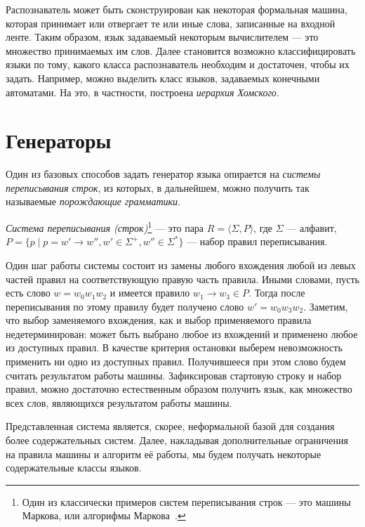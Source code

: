 Распознаватель может быть сконструирован как некоторая формальная машина, которая принимает или отвергает те или иные слова, записанные на входной ленте.
Таким образом, язык задаваемый некоторым вычислителем --- это множество принимаемых им слов.
Далее становится возможно классифицировать языки по тому, какого класса распознаватель необходим и достаточен, чтобы их задать.
Например, можно выделить класс языков, задаваемых конечными автоматами.
На это, в частности, построена \textit{иерархия Хомского}.





\section{Генераторы}

Один из базовых способов задать генератор языка опирается на \textit{системы переписывания строк}, из которых, в дальнейшем, можно получить так называемые \textit{порождающие грамматики}.

\begin{definition}
  \textit{Система переписывания (строк)}\footnote{Один из классически примеров систем переписывания строк --- это машины Маркова, или алгорифмы Маркова~\cite{markov1954theory}.} --- это пара $R = \langle \Sigma, P  \rangle$, где $\Sigma$ --- алфавит, $P= \{p \mid p = w' \to w'', w' \in \Sigma^+, w'' \in \Sigma^*\}$ --- набор правил переписывания.
\end{definition}

Один шаг работы системы состоит из замены любого вхождения любой из левых частей правил на соответствующую правую часть правила.
Иными словами, пусть есть слово $w = w_0w_1w_2$ и имеется правило $w_1 \to w_3 \in P$.
Тогда после переписывания по этому правилу будет получено слово $w' = w_0w_3w_2$.
Заметим, что выбор заменяемого вхождения, как и выбор применяемого правила недетерминирован: может быть выбрано любое из вхождений и применено любое из доступных правил.
В качестве критерия остановки выберем невозможность применить ни одно из доступных правил.
Получившееся при этом слово будем считать результатом работы машины.
Зафиксировав стартовую строку и набор правил, можно достаточно естественным образом получить язык, как множество всех слов, являющихся результатом работы машины.

Представленная система является, скорее, неформальной базой для создания более содержательных систем.
Далее, накладывая дополнительные ограничения на правила машины и алгоритм её работы, мы будем получать некоторые содержательные классы языков.

